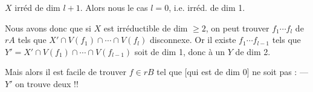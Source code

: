  $X$ irréd de dim $l+1$.
Alors nous 
le cas $l=0$,  i.e.  irréd. de dim 1.

Nous avons donc  que si $X$ est
irréductible de dim $\geq2$, on peut trouver
  $f_1\cdots f_l$ de $rA$ tels que
$X'\cap V(f_1)\cap\cdots\cap V(f_l)$ disconnexe. Or
il existe $f_1\cdots f_{l-1}$ tels que
$Y'=X'\cap V(f_1)\cap\cdots\cap V(f_{l-1})$ soit de dim 1,
donc  à un $Y$ de dim 2.

Mais alors il est facile de
trouver $f\in rB$ tel que   
[qui est de dim 0] ne soit pas
 :   --- 
$Y'$  on trouve deux  !!
